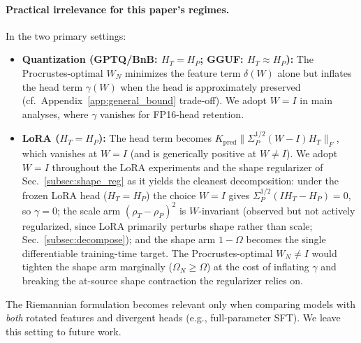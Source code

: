 \paragraph{Practical irrelevance for this paper's regimes.}
In the two primary settings:
\begin{itemize}
    \item \textbf{Quantization (GPTQ/BnB: $H_T = H_P$; GGUF: $H_T \approx H_P$):} The Procrustes-optimal $W_N$ minimizes the feature term $\delta(W)$ alone but inflates the head term $\gamma(W)$ when the head is approximately preserved (cf.~Appendix~\ref{app:general_bound} trade-off). We adopt $W = I$ in main analyses, where $\gamma$ vanishes for FP16-head retention.
    \item \textbf{LoRA ($H_T = H_P$):} The head term becomes $K_{\mathrm{pred}}\|\Sigma_P^{1/2}(W - I) H_T\|_F$, which vanishes at $W = I$ (and is generically positive at $W \neq I$). We adopt $W = I$ throughout the LoRA experiments and the shape regularizer of Sec.~\ref{subsec:shape_reg} as it yields the cleanest decomposition: under the frozen LoRA head ($H_T = H_P$) the choice $W = I$ gives $\Sigma_P^{1/2}(I H_T - H_P) = 0$, so $\gamma = 0$; the scale arm $(\rho_T - \rho_P)^2$ is $W$-invariant (observed but not actively regularized, since LoRA primarily perturbs shape rather than scale; Sec.~\ref{subsec:decompose}); and the shape arm $1 - \Omega$ becomes the single differentiable training-time target. The Procrustes-optimal $W_N \neq I$ would tighten the shape arm marginally ($\Omega_N \ge \Omega$) at the cost of inflating $\gamma$ and breaking the at-source shape contraction the regularizer relies on.
\end{itemize}
The Riemannian formulation becomes relevant only when comparing models with \emph{both} rotated features and divergent heads (e.g., full-parameter SFT). We leave this setting to future work.
